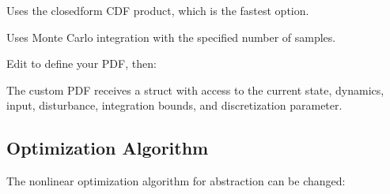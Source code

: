 \documentclass[a4paper,10pt,english]{sphinxmanual}
\begin{document}
\sphinxAtStartPar
Uses the closed\sphinxhyphen{}form CDF product, which is the fastest option.

\sphinxAtStartPar
{}

\begin{sphinxVerbatim}[commandchars=\\\{\}]
\end{sphinxVerbatim}

\sphinxAtStartPar
Uses Monte Carlo integration with the specified number of samples.

\sphinxAtStartPar
{}

\sphinxAtStartPar
Edit  to define your PDF, then:

\begin{sphinxVerbatim}[commandchars=\\\{\}]
\end{sphinxVerbatim}

\sphinxAtStartPar
The custom PDF receives a  struct with access to the current state,
dynamics, input, disturbance, integration bounds, and discretization parameter.


\subsection{Optimization Algorithm}
\label{\detokenize{user-guide/configuration:optimization-algorithm}}
\sphinxAtStartPar
The nonlinear optimization algorithm for abstraction can be changed:

\begin{sphinxVerbatim}[commandchars=\\\{\}]
\end{sphinxVerbatim}
\end{document}
